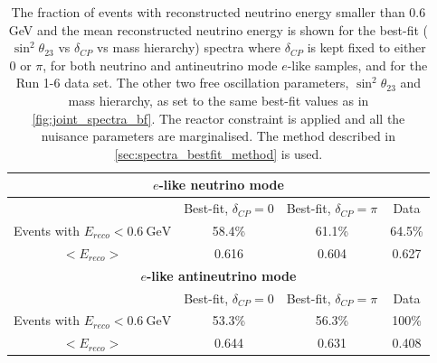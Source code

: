\begin{table}[htb]
\centering
\begin{tabular}{| c | c | c | c |}
\hline
\multicolumn{4}{|c|}{\bf $e$-like neutrino mode } 	 \\ \hline
			 						& Best-fit, $\delta_{CP} = 0$   	& Best-fit, $\delta_{CP} = \pi$ 	& Data	\\ \hline
Events with $E_{reco} < 0.6~\text{GeV}$ 		& 58.4\%		                  	& 61.1\%					& 64.5\%	\\ \hline
$< E_{reco} >$				 			& 0.616		                  	& 0.604					& 0.627	\\ \hline
\hline
\multicolumn{4}{|c|}{\bf $e$-like antineutrino mode } 	 \\ \hline
			 						& Best-fit, $\delta_{CP} = 0$   	& Best-fit, $\delta_{CP} = \pi$ 	& Data	\\ \hline
Events with $E_{reco} < 0.6~\text{GeV}$ 		& 53.3\%	                  		& 56.3\%					& 100\%	\\ \hline
$< E_{reco} >$				 			& 0.644	                  		& 0.631 					& 0.408	\\ \hline
\end{tabular}
\caption{
The fraction of events with reconstructed neutrino energy smaller than 0.6 GeV
and the mean reconstructed neutrino energy is shown
for the best-fit ($\sin^2 \theta_{23}$ vs $\delta_{CP}$ vs mass hierarchy) 
spectra where $\delta_{CP}$ is kept fixed to either 0 or $\pi$,
for both neutrino and antineutrino mode 
$e$-like samples,
and for the Run 1-6 data set.
The other two free oscillation parameters,
$\sin^2 \theta_{23}$ and mass hierarchy,
as set to the same best-fit values as in \cref{fig:joint_spectra_bf}.
The reactor constraint is applied and all the nuisance parameters are marginalised.
The method described in \cref{sec:spectra_bestfit_method} is used.
}
\label{tab:joint_spectra_bf_dcp_0_pi}
\end{table}


